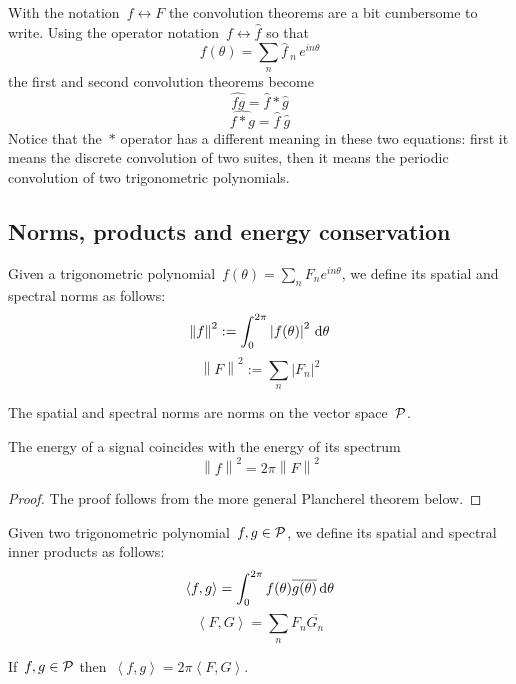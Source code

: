 With the notation~$f\leftrightarrow F$ the convolution theorems are a bit
cumbersome to write.  Using the operator
notation~$f\leftrightarrow\widehat{f}$ so that
$$f(\theta)=\sum_n{\widehat{f}}_{\ n}\,e^{in\theta}$$
the first and second convolution theorems become
$$\widehat{fg}=\widehat{f}*\widehat{g}$$
$$\widehat{f*g}=\widehat{f}\ \widehat{g}$$
Notice that the~$*$ operator has a different meaning in these two equations:
first it means the discrete convolution of two suites, then it means the
periodic convolution of two trigonometric polynomials.


\subsection{Norms, products and energy conservation}

\begin{definition}[Norms]
	Given a trigonometric polynomial~$f(\theta)=\sum_nF_ne^{in\theta}$,
	we define its spatial and spectral norms as follows:
	$$\left\|f\right\|^2:=\int_0^{2\pi}\left|f(\theta)\right|^2\,\mathrm{d}\theta$$
	$$\left\|F\right\|^2:=\sum_n\left|F_n\right|^2$$
\end{definition}

\begin{proposition}
	The spatial and spectral norms are norms on the vector
	space~$\mathcal{P}$.
\end{proposition}

\begin{proposition}
	The energy of a signal coincides with the energy of its spectrum
	$$ \left\|f\right\|^2 = 2\pi\left\|F\right\|^2 $$
\end{proposition}
\begin{proof}
	The proof follows from the more general Plancherel theorem below.
\end{proof}

\begin{definition}
	Given two trigonometric polynomial~$f,g\in\mathcal{P}$,
	we define its spatial and spectral inner products as follows:
	$$\left<f,g\right>=\int_0^{2\pi}f(\theta)\overline{g(\theta)}\,\mathrm{d}\theta$$
	$$\left<F,G\right>=\sum_nF_n\overline{G_n}$$
\end{definition}

\begin{proposition}
	If~$f,g\in\mathcal{P}$ then~$\left<f,g\right>=2\pi\left<F,G\right>$.
\end{proposition}

